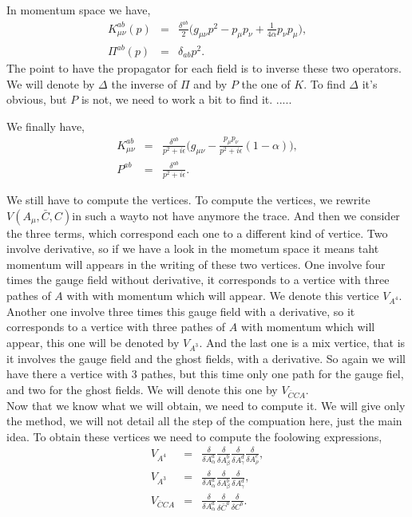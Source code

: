 \documentclass[a4paper,11pt]{article} %
\numberwithin{equation}{section} %
\numberwithin{figure}{section} %
\theoremstyle{plain} %
\theoremstyle{definition} %
\theoremstyle{remark} %
\begin{document}
In momentum space we have,
\begin{eqnarray*}
 K^{ab}_{\mu \nu} (p) &=& \frac{\delta^{ab}}{2} \Big( g_{\mu \nu} p^2 - p_{\mu} p_{\nu} + \frac{1}{4 \alpha} p_{\nu} p_{\mu}  \Big) ,\\
 \Pi^{ab} (p) &=& \delta_{ab} p^{2}.
\end{eqnarray*}
The point to have the propagator for each field is to inverse these two operators. We will denote by $\Delta$ the inverse of $\Pi$ and by $P$ the one of $K$. To find $\Delta$ it's obvious, but $P$ is not, we need to work a bit to find it. .....

\noindent
We finally have,
\begin{eqnarray*}
 K^{ab}_{\mu \nu} &=& \frac{\delta^{ab}}{p^2+i\epsilon} \Bigg( g_{\mu \nu} - \frac{p_{\mu} p_{\nu}}{p^2+i\epsilon} (1-\alpha) \Bigg),\\
 P^{ab} &=& \frac{\delta^{ab}}{p^2+i\epsilon}.
\end{eqnarray*}

\noindent
We still have to compute the vertices. To compute the vertices, we rewrite $V(A_\mu , \bar{C}, C)$in such a wayto not have anymore the trace. And then we consider the three terms, which correspond each one to a different kind of vertice. Two involve derivative, so if we have a look in the mometum space it means taht momentum will appears in the writing of these two vertices. One involve four times the gauge field without derivative, it corresponds to a vertice with three pathes of $A$ with with momentum which will appear. We denote this vertice $V_{A^4}$. Another one involve three times this gauge field  with a derivative, so it corresponds to a vertice with three pathes of $A$ with momentum which will appear, this one will be denoted by $V_{A^3}$. And the last one is a mix vertice, that is it involves the gauge field and the ghost fields, with a derivative. So again we will have there a vertice with 3 pathes, but this time only one path for the gauge fiel, and two for the ghost fields. We will denote this 
one by $V_{\bar{C} C A}$.\\
Now that we know what we will obtain, we need to compute it. We will give only the method, we will not detail all the step of the compuation here, just the main idea. To obtain these vertices we need to compute the foolowing expressions,
\begin{eqnarray*}
 V_{A^4} &=& \frac{\delta}{\delta A^{a}_{\alpha}} \frac{\delta}{\delta A^{b}_{\beta}} \frac{\delta}{\delta A^{d}_{\gamma}} \frac{\delta}{\delta A^{e}_{\rho}}  ,\\
 V_{A^3} &=& \frac{\delta}{\delta A^{a}_{\alpha} } \frac{\delta}{\delta A^{b}_{\beta} } \frac{\delta}{\delta A^{d}_{\gamma} } ,\\
 V_{\bar{C}CA} &=& \frac{\delta}{\delta A^{a}_{\alpha} } \frac{\delta}{\delta \bar{C}^a } \frac{\delta}{\delta C^b} .
\end{eqnarray*}
\end{document}
